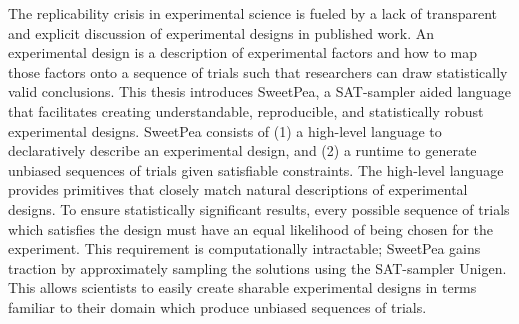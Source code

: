 
The replicability crisis in experimental science is fueled by a lack of transparent and explicit discussion of experimental designs in published work. An experimental design is a description of experimental factors and how to map those factors onto a sequence of trials such that researchers can draw statistically valid conclusions. This thesis introduces SweetPea, a SAT-sampler aided language that facilitates creating understandable, reproducible, and statistically robust experimental designs. SweetPea consists of (1) a high-level language to declaratively describe an experimental design, and (2) a runtime to generate unbiased sequences of trials given satisfiable constraints. The high-level language provides primitives that closely match natural descriptions of experimental designs. To ensure statistically significant results, every possible sequence of trials which satisfies the design must have an equal likelihood of being chosen for the experiment. This requirement is computationally intractable; SweetPea gains traction by approximately sampling the solutions using the SAT-sampler Unigen. This allows scientists to easily create sharable experimental designs in terms familiar to their domain which produce unbiased sequences of trials.
